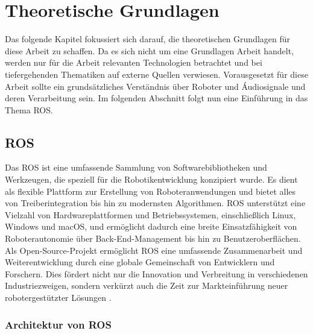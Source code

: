 \chapter{Theoretische Grundlagen}
\label{Kapitel2}

Das folgende Kapitel fokussiert sich darauf, die theoretischen Grundlagen für diese Arbeit zu schaffen. Da es sich nicht um eine Grundlagen Arbeit handelt, werden nur für die Arbeit relevanten Technologien betrachtet und bei tiefergehenden Thematiken auf externe Quellen verwiesen. Vorausgesetzt für diese Arbeit sollte ein grundsätzliches Verständnis über Roboter und Áudiosignale und deren Verarbeitung sein. Im folgenden Abschnitt folgt nun eine Einführung in das Thema ROS.

\section{ROS}

Das \ac{ROS} ist eine umfassende Sammlung von Softwarebibliotheken und Werkzeugen, die speziell für die Robotikentwicklung konzipiert wurde. Es dient als flexible Plattform zur Erstellung von Roboteranwendungen und bietet alles von Treiberintegration bis hin zu modernsten Algorithmen. \ac{ROS} unterstützt eine Vielzahl von Hardwareplattformen und Betriebssystemen, einschließlich Linux, Windows und macOS, und ermöglicht dadurch eine breite Einsatzfähigkeit von Roboterautonomie über Back-End-Management bis hin zu Benutzeroberflächen. Als Open-Source-Projekt ermöglicht \ac{ROS} eine umfassende Zusammenarbeit und Weiterentwicklung durch eine globale Gemeinschaft von Entwicklern und Forschern. Dies fördert nicht nur die Innovation und Verbreitung in verschiedenen Industriezweigen, sondern verkürzt auch die Zeit zur Markteinführung neuer robotergestützter Lösungen \cite{ros_official} \cite{ros_wiki_intro}.

\subsection{Architektur von ROS}

